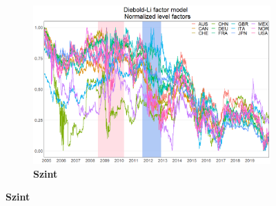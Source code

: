 \documentclass[12pt,bibliography=totoc]{article}
\begin{document}
\begin{figure}[H]
\centering
\caption{Normalizált faktorok idősorai}
\begin{subfigure}{.5\linewidth}
\centering
\includegraphics[width=\linewidth]{Normalizedlevel}
\caption{\textbf{Szint}}


\end{subfigure}
\end{figure}
\end{document}
